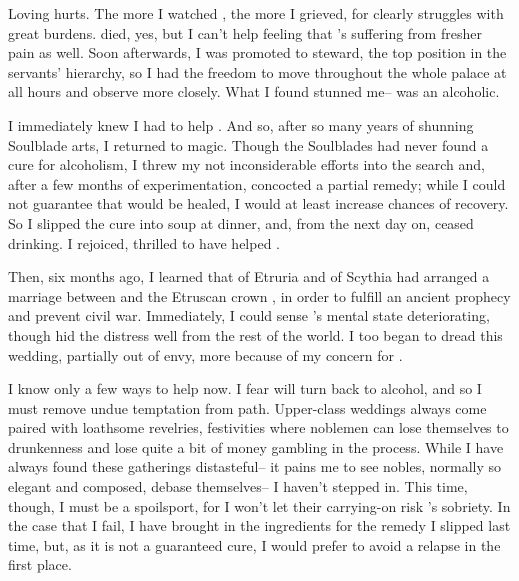 \documentclass[char]{Kos}
\begin{document}
Loving \cBride{\them} hurts. The more I watched \cBride{\them}, the more I grieved, for \cBride{\they} clearly struggles with great burdens. \cBride{\Their} \cFugitive{\sibling} died, yes, but I can't help feeling that \cBride{}'s suffering from fresher pain as well. Soon afterwards, I was promoted to steward, the top position in the servants' hierarchy, so I had the freedom to move throughout the whole palace at all hours and observe \cBride{\them} more closely. What I found stunned me-- \cBride{\they} was an alcoholic.

I immediately knew I had to help \cBride{\them}. And so, after so many years of shunning Soulblade arts, I returned to magic. Though the Soulblades had never found a cure for alcoholism, I threw my not inconsiderable efforts into the search and, after a few months of experimentation, concocted a partial remedy; while I could not guarantee that \cBride{\they} would be healed, I would at least increase \cBride{\their} chances of recovery. So I slipped the cure into \cBride{\their} soup at dinner, and, from the next day on, \cBride{\they} ceased drinking. I rejoiced, thrilled to have helped \cBride{\them}.

Then, six months ago, I learned that \cEtruriaKing{\Monarch} \cEtruriaKing{} of Etruria and \cScythiaKing{\Monarch} \cScythiaKing{} of Scythia had arranged a marriage between \cBride{} and the Etruscan crown \cGroom{\prince} \cGroom{}, in order to fulfill an ancient prophecy and prevent civil war. Immediately, I could sense \cBride{}'s mental state deteriorating, though \cBride{\they} hid the distress well from the rest of the world. I too began to dread this wedding, partially out of envy, more because of my concern for \cBride{\them}.

I know only a few ways to help \cBride{\them} now. I fear \cBride{\they} will turn back to alcohol, and so I must remove undue temptation from \cBride{\their} path. Upper-class weddings always come paired with loathsome revelries, festivities where noblemen can lose themselves to drunkenness and lose quite a bit of money gambling in the process. While I have always found these gatherings distasteful-- it pains me to see nobles, normally so elegant and composed, debase themselves-- I haven't stepped in. This time, though, I must be a spoilsport, for I won't let their carrying-on risk \cBride{}'s sobriety. In the case that I fail, I have brought in the ingredients for the remedy I slipped \cBride{\them} last time, but, as it is not a guaranteed cure, I would prefer to avoid a relapse in the first place.
\end{document}
